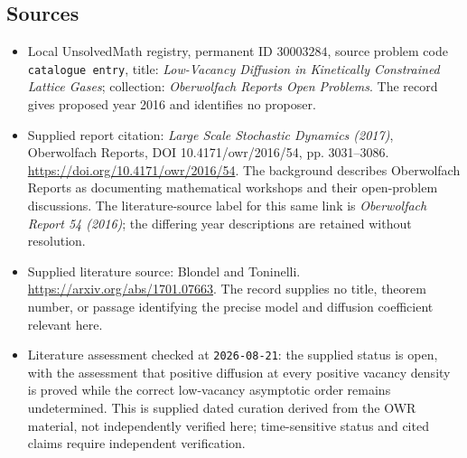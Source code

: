 \documentclass[11pt]{article}
\begin{document}
\subsection{Sources}
\begin{itemize}
\item Local UnsolvedMath registry, permanent ID \(30003284\), source problem code \texttt{catalogue entry}, title: \emph{Low-Vacancy Diffusion in Kinetically Constrained Lattice Gases}; collection: \emph{Oberwolfach Reports Open Problems}. The record gives proposed year 2016 and identifies no proposer.
\item Supplied report citation: \emph{Large Scale Stochastic Dynamics (2017)}, Oberwolfach Reports, DOI 10.4171/owr/2016/54, pp. 3031--3086. \url{https://doi.org/10.4171/owr/2016/54}. The background describes Oberwolfach Reports as documenting mathematical workshops and their open-problem discussions. The literature-source label for this same link is \emph{Oberwolfach Report 54 (2016)}; the differing year descriptions are retained without resolution.
\item Supplied literature source: Blondel and Toninelli. \url{https://arxiv.org/abs/1701.07663}. The record supplies no title, theorem number, or passage identifying the precise model and diffusion coefficient relevant here.
\item Literature assessment checked at \texttt{2026-08-21}: the supplied status is open, with the assessment that positive diffusion at every positive vacancy density is proved while the correct low-vacancy asymptotic order remains undetermined. This is supplied dated curation derived from the OWR material, not independently verified here; time-sensitive status and cited claims require independent verification.
\end{itemize}
\end{document}
